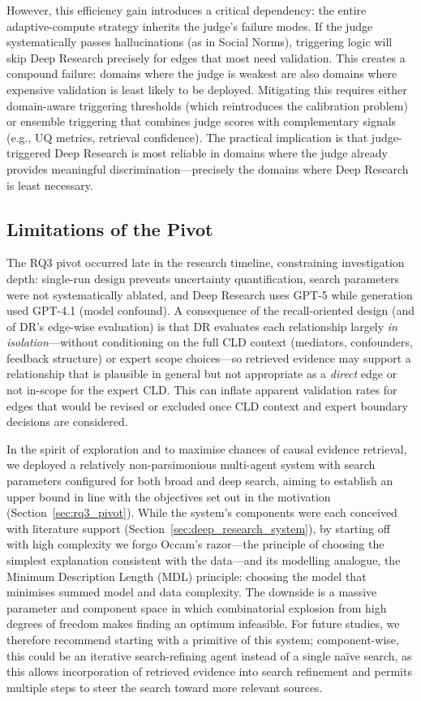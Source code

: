However, this efficiency gain introduces a critical dependency: the entire adaptive-compute strategy inherits the judge's failure modes. If the judge systematically passes hallucinations (as in Social Norms), triggering logic will skip Deep Research precisely for edges that most need validation. This creates a compound failure: domains where the judge is weakest are also domains where expensive validation is least likely to be deployed. Mitigating this requires either domain-aware triggering thresholds (which reintroduces the calibration problem) or ensemble triggering that combines judge scores with complementary signals (e.g., UQ metrics, retrieval confidence). The practical implication is that judge-triggered Deep Research is most reliable in domains where the judge already provides meaningful discrimination---precisely the domains where Deep Research is least necessary.

\subsection{Limitations of the Pivot}

The RQ3 pivot occurred late in the research timeline, constraining investigation depth: single-run design prevents uncertainty quantification, search parameters were not systematically ablated, and Deep Research uses GPT-5 while generation used GPT-4.1 (model confound). A consequence of the recall-oriented design (and of DR's edge-wise evaluation) is that DR evaluates each relationship largely \textit{in isolation}---without conditioning on the full CLD context (mediators, confounders, feedback structure) or expert scope choices---so retrieved evidence may support a relationship that is plausible in general but not appropriate as a \emph{direct} edge or not in-scope for the expert CLD. This can inflate apparent validation rates for edges that would be revised or excluded once CLD context and expert boundary decisions are considered.

In the spirit of exploration and to maximise chances of causal evidence retrieval, we deployed a relatively non-parsimonious multi-agent system with search parameters configured for both broad and deep search, aiming to establish an upper bound in line with the objectives set out in the motivation (Section~\ref{sec:rq3_pivot}). While the system's components were each conceived with literature support (Section~\ref{sec:deep_research_system}), by starting off with high complexity we forgo Occam's razor---the principle of choosing the simplest explanation consistent with the data---and its modelling analogue, the Minimum Description Length (MDL) principle: choosing the model that minimises summed model and data complexity. The downside is a massive parameter and component space in which combinatorial explosion from high degrees of freedom makes finding an optimum infeasible. For future studies, we therefore recommend starting with a primitive of this system; component-wise, this could be an iterative search-refining agent instead of a single naïve search, as this allows incorporation of retrieved evidence into search refinement and permits multiple steps to steer the search toward more relevant sources.

